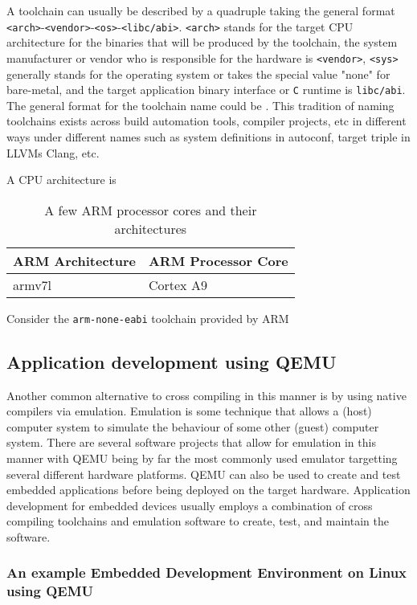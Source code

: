 A toolchain can usually be described by a quadruple taking the general format \texttt{<arch>}-\texttt{<vendor>}-\texttt{<os>}-\texttt{<libc/abi>}. \texttt{<arch>} stands for the target CPU architecture for the binaries that will be produced by the toolchain, the system manufacturer or vendor who is responsible for the hardware is \texttt{<vendor>}, \texttt{<sys>} generally stands for the operating system or takes the special value "none" for bare-metal, and the target application binary interface or \texttt{C} runtime is \texttt{libc/abi}. The general format for the toolchain name could be . This tradition of naming toolchains exists across build automation tools, compiler projects, etc in different ways under different names such as system definitions in autoconf, target triple in LLVM\textquotesingle s Clang, etc.

A CPU architecture is

\begin{table}[h]
	\centering
	\begin{tabular}{ |p{9em}|p{14em}| }
		\hline
			\textbf{ARM Architecture} & \textbf{ARM Processor Core} \\
		\hline
			armv7l & Cortex A9 \\
		\hline
	\end{tabular}
	\caption{A few ARM processor cores and their architectures}
	\label{table:arm}
\end{table}

Consider the \texttt{arm-none-eabi} toolchain provided by ARM


\subsection{Application development using QEMU}

Another common alternative to cross compiling in this manner is by using native compilers via emulation. Emulation is some technique that allows a (host) computer system to simulate the behaviour of some other (guest) computer system. There are several software projects that allow for emulation in this manner with QEMU being by far the most commonly used emulator targetting several different hardware platforms. QEMU can also be used to create and test embedded applications before being deployed on the target hardware. Application development for embedded devices usually employs a combination of cross compiling toolchains and emulation software to create, test, and maintain the software.

\subsubsection{An example Embedded Development Environment on Linux using QEMU}

